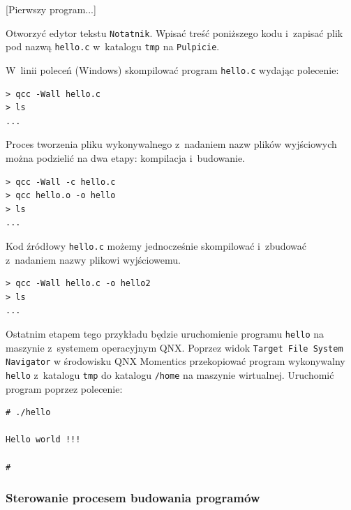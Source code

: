 \begin{example}{[Pierwszy program...]} \label{ex:pierwszy}

Otworzyć edytor tekstu \lstinline[style=MyBashStyle]{Notatnik}. Wpisać treść poniższego kodu i~zapisać plik pod nazwą \lstinline[style=MyBashStyle]{hello.c} w~katalogu \lstinline[style=MyBashStyle]{tmp} na \lstinline[style=MyBashStyle]{Pulpicie}.



W~linii poleceń (Windows) skompilować program \lstinline[style=MyBashStyle]{hello.c} wydając polecenie:

\begin{lstlisting}[style=MyBashStyle]
> qcc -Wall hello.c
> ls
...
\end{lstlisting}

Proces tworzenia pliku wykonywalnego z~nadaniem nazw plików wyjściowych można podzielić na dwa etapy: kompilacja i~budowanie.

\begin{lstlisting}[style=MyBashStyle]
> qcc -Wall -c hello.c
> qcc hello.o -o hello
> ls
...
\end{lstlisting}

Kod źródłowy \lstinline[style=MyBashStyle]{hello.c} możemy jednocześnie skompilować i~zbudować z~nadaniem nazwy plikowi wyjściowemu.

\begin{lstlisting}[style=MyBashStyle]
> qcc -Wall hello.c -o hello2
> ls
...
\end{lstlisting}

Ostatnim etapem tego przykładu będzie uruchomienie programu \lstinline[style=MyBashStyle]{hello} na maszynie z~systemem operacyjnym QNX. Poprzez widok \lstinline[style=MyBashStyle]{Target File System Navigator} w środowisku QNX Momentics przekopiować program wykonywalny \lstinline[style=MyBashStyle]{hello} z~katalogu \lstinline[style=MyBashStyle]{tmp} do katalogu \lstinline[style=MyBashStyle]{/home} na maszynie wirtualnej. Uruchomić program poprzez polecenie:

\begin{lstlisting}[style=MyBashStyle]
# ./hello

Hello world !!!

#
\end{lstlisting}
\end{example}

\subsubsection{Sterowanie procesem budowania programów}

